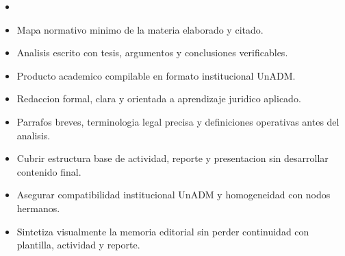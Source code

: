 \documentclass[12pt]{article}
\begin{document}
\begin{itemize}[leftmargin=*]
  \item \\%
  \item Mapa normativo minimo de la materia elaborado y citado.
  \item Analisis escrito con tesis, argumentos y conclusiones verificables.
  \item Producto academico compilable en formato institucional UnADM.
  \item Redaccion formal, clara y orientada a aprendizaje juridico aplicado.
  \item Parrafos breves, terminologia legal precisa y definiciones operativas antes del analisis.
  \item Cubrir estructura base de actividad, reporte y presentacion sin desarrollar contenido final.
  \item Asegurar compatibilidad institucional UnADM y homogeneidad con nodos hermanos.
  \item Sintetiza visualmente la memoria editorial sin perder continuidad con plantilla, actividad y reporte.
\end{itemize}
\end{document}
